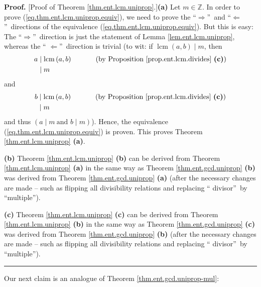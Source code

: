 \documentclass[numbers=enddot,12pt,final,onecolumn,notitlepage]{scrartcl}%
\numberwithin{exer}{subsection}
\theoremstyle{definition}
\newenvironment{proof}[1][Proof]{\noindent\textbf{#1.} }{\ \rule{0.5em}{0.5em}}
\begin{document}
\begin{proof}
[Proof of Theorem \ref{thm.ent.lcm.uniprop}.]\textbf{(a)} Let $m\in\mathbb{Z}%
$. In order to prove (\ref{eq.thm.ent.lcm.uniprop.equiv}), we need to prove
the \textquotedblleft$\Longrightarrow$\textquotedblright\ and
\textquotedblleft$\Longleftarrow$\textquotedblright\ directions of the
equivalence (\ref{eq.thm.ent.lcm.uniprop.equiv}). But this is easy: The
\textquotedblleft$\Longrightarrow$\textquotedblright\ direction is just the
statement of Lemma \ref{lem.ent.lcm.uniprop}, whereas the \textquotedblleft%
$\Longleftarrow$\textquotedblright\ direction is trivial (to wit: if
$\operatorname{lcm}\left(  a,b\right)  \mid m$, then%
\begin{align*}
a  &  \mid\operatorname{lcm}\left(  a,b\right)  \ \ \ \ \ \ \ \ \ \ \left(
\text{by Proposition \ref{prop.ent.lcm.divides} \textbf{(c)}}\right) \\
&  \mid m
\end{align*}
and%
\begin{align*}
b  &  \mid\operatorname{lcm}\left(  a,b\right)  \ \ \ \ \ \ \ \ \ \ \left(
\text{by Proposition \ref{prop.ent.lcm.divides} \textbf{(c)}}\right) \\
&  \mid m
\end{align*}
and thus $\left(  a\mid m\ \text{and }b\mid m\right)  $). Hence, the
equivalence (\ref{eq.thm.ent.lcm.uniprop.equiv}) is proven. This proves
Theorem \ref{thm.ent.lcm.uniprop} \textbf{(a)}.

\textbf{(b)} Theorem \ref{thm.ent.lcm.uniprop} \textbf{(b)} can be derived
from Theorem \ref{thm.ent.lcm.uniprop} \textbf{(a)} in the same way as Theorem
\ref{thm.ent.gcd.uniprop} \textbf{(b)} was derived from Theorem
\ref{thm.ent.gcd.uniprop} \textbf{(a)} (after the necessary changes are made
-- such as flipping all divisibility relations and replacing \textquotedblleft
divisor\textquotedblright\ by \textquotedblleft multiple\textquotedblright).

\textbf{(c)} Theorem \ref{thm.ent.lcm.uniprop} \textbf{(c)} can be derived
from Theorem \ref{thm.ent.lcm.uniprop} \textbf{(b)} in the same way as Theorem
\ref{thm.ent.gcd.uniprop} \textbf{(c)} was derived from Theorem
\ref{thm.ent.gcd.uniprop} \textbf{(b)} (after the necessary changes are made
-- such as flipping all divisibility relations and replacing \textquotedblleft
divisor\textquotedblright\ by \textquotedblleft multiple\textquotedblright).
\end{proof}

Our next claim is an analogue of Theorem \ref{thm.ent.gcd.uniprop-mul}:
\end{document}
